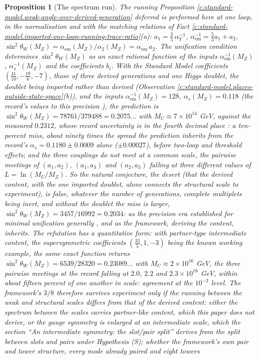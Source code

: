 \documentclass[11pt]{article}
\newtheorem{proposition}[theorem]{Proposition}
\theoremstyle{definition}
\theoremstyle{plain}
\newcommand{\changedmark}[2]{\marginpar{\raggedright\scriptsize\color{#1}#2}}
\begin{document}
\begin{proposition}[The spectrum run]\label{c:standard-model.spectrum-run}
\changedmark{BurntOrange}{changed since the deposit}
The running Proposition \ref{c:standard-model.weak-angle-over-derived-generation} deferred is performed here at one loop, in the normalisation and with the matching relations of Fact \ref{c:standard-model.imported-one-loop-running-trace-ratio}(a): $a_{1} = \tfrac35\,\alpha_{Y}^{-1}$, $\alpha_{\mathrm{em}}^{-1} = \tfrac53 a_{1} + a_{2}$, $\sin^{2}\theta_{W}(M_{Z}) = \alpha_{\mathrm{em}}(M_{Z})/\alpha_{2}(M_{Z}) = \alpha_{\mathrm{em}}\,a_{2}$. The unification condition determines $\sin^{2}\theta_{W}(M_{Z})$ as an exact rational function of the inputs $\alpha_{\mathrm{em}}^{-1}(M_{Z})$, $\alpha_{s}^{-1}(M_{Z})$ and the coefficients $b_{i}$. With the Standard Model coefficients $(\tfrac{41}{10}, -\tfrac{19}{6}, -7)$, those of three derived generations and one Higgs doublet, the doublet being imported rather than derived (Observation \ref{c:standard-model.places-outside-state-space}(b)), and the inputs $\alpha_{\mathrm{em}}^{-1}(M_{Z}) = 128$, $\alpha_{s}(M_{Z}) = 0.118$ (the record's values to this precision \cite{PDG2024}), the prediction is $\sin^{2}\theta_{W}(M_{Z}) = 78761/379488 = 0.2075\ldots$ with $M_{U} \approx 7 \times 10^{14}$ GeV, against the measured $0.2312$, whose record uncertainty is in the fourth decimal place \cite{PDG2024}: a ten-percent miss, about ninety times the spread the prediction inherits from the record's $\alpha_{s} = 0.1180 \pm 0.0009$ alone ($\pm 0.00027$), before two-loop and threshold effects; and the three couplings do not meet at a common scale, the pairwise meetings of $(a_{1}, a_{2})$, $(a_{1}, a_{3})$ and $(a_{2}, a_{3})$ falling at three different values of $L = \ln(M_{U}/M_{Z})$. So the natural conjecture, the desert (that the derived content, with the one imported doublet, alone connects the structural scale to experiment), is false, whatever the number of generations, complete multiplets being inert, and without the doublet the miss is larger, $\sin^{2}\theta_{W}(M_{Z}) = 3457/16992 = 0.2034$: as the precision era established for minimal unification generally \cite{Amaldi1991}, and as the framework, deriving the content, inherits. The refutation has a quantitative form: with partner-type intermediate content, the supersymmetric coefficients $(\tfrac{33}{5}, 1, -3)$ being the known working example, the same exact function returns $\sin^{2}\theta_{W}(M_{Z}) = 6539/28320 = 0.23089\ldots$ with $M_{U} \approx 2 \times 10^{16}$ GeV, the three pairwise meetings at the record falling at $2.0$, $2.2$ and $2.3 \times 10^{16}$ GeV, within about fifteen percent of one another in scale: agreement at the $10^{-3}$ level. The framework's $3/8$ therefore survives experiment only if the running between the weak and structural scales differs from that of the derived content: either the spectrum between the scales carries partner-like content, which this paper does not derive, or the gauge symmetry is enlarged at an intermediate scale, which the section ``An intermediate symmetry: the slot/pair split'' derives from the split between slots and pairs under Hypothesis (S); whether the framework's own pair and tower structure, every mode already paired and eight towers 
\end{proposition}
\end{document}
